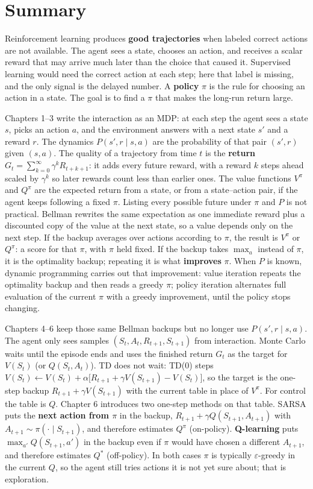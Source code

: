 \chapter{Summary}

Reinforcement learning produces \textbf{good trajectories} when labeled correct actions are not available. The agent sees a state, chooses an action, and receives a scalar reward that may arrive much later than the choice that caused it. Supervised learning would need the correct action at each step; here that label is missing, and the only signal is the delayed number. A \textbf{policy} $\pi$ is the rule for choosing an action in a state. The goal is to find a $\pi$ that makes the long-run return large.

Chapters 1--3 write the interaction as an MDP: at each step the agent sees a state $s$, picks an action $a$, and the environment answers with a next state $s'$ and a reward $r$. The dynamics $P(s',r\mid s,a)$ are the probability of that pair $(s',r)$ given $(s,a)$. The quality of a trajectory from time $t$ is the \textbf{return} $G_t=\sum_{k=0}^\infty\gamma^k R_{t+k+1}$: it adds every future reward, with a reward $k$ steps ahead scaled by $\gamma^k$ so later rewards count less than earlier ones. The value functions $V^\pi$ and $Q^\pi$ are the expected return from a state, or from a state--action pair, if the agent keeps following a fixed $\pi$. Listing every possible future under $\pi$ and $P$ is not practical. Bellman rewrites the same expectation as one immediate reward plus a discounted copy of the value at the next state, so a value depends only on the next step. If the backup averages over actions according to $\pi$, the result is $V^\pi$ or $Q^\pi$: a score for that $\pi$, with $\pi$ held fixed. If the backup takes $\max_a$ instead of $\pi$, it is the optimality backup; repeating it is what \textbf{improves} $\pi$. When $P$ is known, dynamic programming carries out that improvement: value iteration repeats the optimality backup and then reads a greedy $\pi$; policy iteration alternates full evaluation of the current $\pi$ with a greedy improvement, until the policy stops changing.

Chapters 4--6 keep those same Bellman backups but no longer use $P(s',r\mid s,a)$. The agent only sees samples $(S_t,A_t,R_{t+1},S_{t+1})$ from interaction. Monte Carlo waits until the episode ends and uses the finished return $G_t$ as the target for $V(S_t)$ (or $Q(S_t,A_t)$). TD does not wait: TD(0) steps $V(S_t)\leftarrow V(S_t)+\alpha\bigl[R_{t+1}+\gamma V(S_{t+1})-V(S_t)\bigr]$, so the target is the one-step backup $R_{t+1}+\gamma V(S_{t+1})$ with the current table in place of $V^\pi$. For control the table is $Q$. Chapter 6 introduces two one-step methods on that table. SARSA puts the \textbf{next action from $\pi$} in the backup, $R_{t+1}+\gamma Q(S_{t+1},A_{t+1})$ with $A_{t+1}\sim\pi(\cdot\mid S_{t+1})$, and therefore estimates $Q^\pi$ (on-policy). \textbf{Q-learning} puts $\max_{a'}Q(S_{t+1},a')$ in the backup even if $\pi$ would have chosen a different $A_{t+1}$, and therefore estimates $Q^*$ (off-policy). In both cases $\pi$ is typically $\varepsilon$-greedy in the current $Q$, so the agent still tries actions it is not yet sure about; that is exploration.


